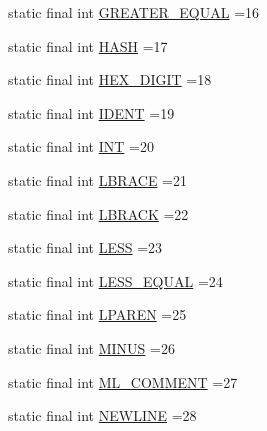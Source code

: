 \begin{DoxyCompactItemize}
\item 
static final int \hyperlink{classorg_1_1tzi_1_1use_1_1parser_1_1shell_1_1_shell_command_lexer_aa761ff883ca99c372bf6752f18e4b142}{G\-R\-E\-A\-T\-E\-R\-\_\-\-E\-Q\-U\-A\-L} =16
\item 
static final int \hyperlink{classorg_1_1tzi_1_1use_1_1parser_1_1shell_1_1_shell_command_lexer_a0ead90eb3cbcab7937c65af13b48a2c9}{H\-A\-S\-H} =17
\item 
static final int \hyperlink{classorg_1_1tzi_1_1use_1_1parser_1_1shell_1_1_shell_command_lexer_aeda0ac0af4844001e841ff436207bb7c}{H\-E\-X\-\_\-\-D\-I\-G\-I\-T} =18
\item 
static final int \hyperlink{classorg_1_1tzi_1_1use_1_1parser_1_1shell_1_1_shell_command_lexer_ac70d67b7d514559405582b7b2f7480a3}{I\-D\-E\-N\-T} =19
\item 
static final int \hyperlink{classorg_1_1tzi_1_1use_1_1parser_1_1shell_1_1_shell_command_lexer_a9e30c4c600b7f5abd920bfba69794910}{I\-N\-T} =20
\item 
static final int \hyperlink{classorg_1_1tzi_1_1use_1_1parser_1_1shell_1_1_shell_command_lexer_abd583ca24624f148f8f3889869c95565}{L\-B\-R\-A\-C\-E} =21
\item 
static final int \hyperlink{classorg_1_1tzi_1_1use_1_1parser_1_1shell_1_1_shell_command_lexer_aba5a443b6375ce158f7f3d3ef0b45da4}{L\-B\-R\-A\-C\-K} =22
\item 
static final int \hyperlink{classorg_1_1tzi_1_1use_1_1parser_1_1shell_1_1_shell_command_lexer_aecca9d5a2a20056a8da9a380752e4caa}{L\-E\-S\-S} =23
\item 
static final int \hyperlink{classorg_1_1tzi_1_1use_1_1parser_1_1shell_1_1_shell_command_lexer_ad039c193eeea585a811cb2a33745e36a}{L\-E\-S\-S\-\_\-\-E\-Q\-U\-A\-L} =24
\item 
static final int \hyperlink{classorg_1_1tzi_1_1use_1_1parser_1_1shell_1_1_shell_command_lexer_aedf7d76d40047bdfd80344f41ba3fbe8}{L\-P\-A\-R\-E\-N} =25
\item 
static final int \hyperlink{classorg_1_1tzi_1_1use_1_1parser_1_1shell_1_1_shell_command_lexer_a52122bc2d64d55d79ccb6a3895709b25}{M\-I\-N\-U\-S} =26
\item 
static final int \hyperlink{classorg_1_1tzi_1_1use_1_1parser_1_1shell_1_1_shell_command_lexer_a697533bd7d95ebf5bb0febfcc146b037}{M\-L\-\_\-\-C\-O\-M\-M\-E\-N\-T} =27
\item 
static final int \hyperlink{classorg_1_1tzi_1_1use_1_1parser_1_1shell_1_1_shell_command_lexer_a5205cd54f62909fe42d369a78bb75d68}{N\-E\-W\-L\-I\-N\-E} =28

\end{DoxyCompactItemize}
